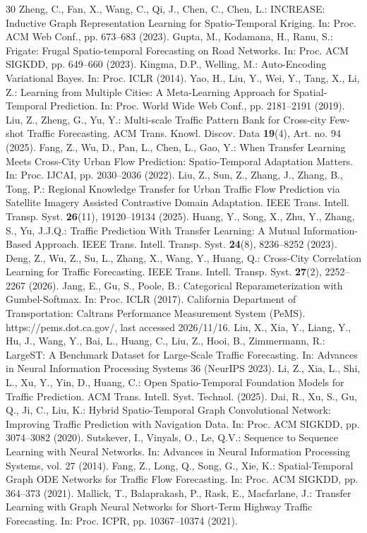 \documentclass[runningheads,a4paper]{llncs}
\begin{document}
\begin{thebibliography}{30}
 Zheng, C., Fan, X., Wang, C., Qi, J., Chen, C., Chen, L.: INCREASE: Inductive Graph Representation Learning for Spatio-Temporal Kriging. In: Proc. ACM Web Conf., pp. 673--683 (2023). 
 Gupta, M., Kodamana, H., Ranu, S.: Frigate: Frugal Spatio-temporal Forecasting on Road Networks. In: Proc. ACM SIGKDD, pp. 649--660 (2023). 
 Kingma, D.P., Welling, M.: Auto-Encoding Variational Bayes. In: Proc. ICLR (2014).
 Yao, H., Liu, Y., Wei, Y., Tang, X., Li, Z.: Learning from Multiple Cities: A Meta-Learning Approach for Spatial-Temporal Prediction. In: Proc. World Wide Web Conf., pp. 2181--2191 (2019). 
 Liu, Z., Zheng, G., Yu, Y.: Multi-scale Traffic Pattern Bank for Cross-city Few-shot Traffic Forecasting. ACM Trans. Knowl. Discov. Data \textbf{19}(4), Art. no. 94 (2025). 
 Fang, Z., Wu, D., Pan, L., Chen, L., Gao, Y.: When Transfer Learning Meets Cross-City Urban Flow Prediction: Spatio-Temporal Adaptation Matters. In: Proc. IJCAI, pp. 2030--2036 (2022). 
 Liu, Z., Sun, Z., Zhang, J., Zhang, B., Tong, P.: Regional Knowledge Transfer for Urban Traffic Flow Prediction via Satellite Imagery Assisted Contrastive Domain Adaptation. IEEE Trans. Intell. Transp. Syst. \textbf{26}(11), 19120--19134 (2025). 
 Huang, Y., Song, X., Zhu, Y., Zhang, S., Yu, J.J.Q.: Traffic Prediction With Transfer Learning: A Mutual Information-Based Approach. IEEE Trans. Intell. Transp. Syst. \textbf{24}(8), 8236--8252 (2023). 
 Deng, Z., Wu, Z., Su, L., Zhang, X., Wang, Y., Huang, Q.: Cross-City Correlation Learning for Traffic Forecasting. IEEE Trans. Intell. Transp. Syst. \textbf{27}(2), 2252--2267 (2026). 
 Jang, E., Gu, S., Poole, B.: Categorical Reparameterization with Gumbel-Softmax. In: Proc. ICLR (2017).
 California Department of Transportation: Caltrans Performance Measurement System (PeMS). https://pems.dot.ca.gov/, last accessed 2026/11/16.
 Liu, X., Xia, Y., Liang, Y., Hu, J., Wang, Y., Bai, L., Huang, C., Liu, Z., Hooi, B., Zimmermann, R.: LargeST: A Benchmark Dataset for Large-Scale Traffic Forecasting. In: Advances in Neural Information Processing Systems 36 (NeurIPS 2023).
 Li, Z., Xia, L., Shi, L., Xu, Y., Yin, D., Huang, C.: Open Spatio-Temporal Foundation Models for Traffic Prediction. ACM Trans. Intell. Syst. Technol. (2025). 
 Dai, R., Xu, S., Gu, Q., Ji, C., Liu, K.: Hybrid Spatio-Temporal Graph Convolutional Network: Improving Traffic Prediction with Navigation Data. In: Proc. ACM SIGKDD, pp. 3074--3082 (2020).
 Sutskever, I., Vinyals, O., Le, Q.V.: Sequence to Sequence Learning with Neural Networks. In: Advances in Neural Information Processing Systems, vol. 27 (2014).
 Fang, Z., Long, Q., Song, G., Xie, K.: Spatial-Temporal Graph ODE Networks for Traffic Flow Forecasting. In: Proc. ACM SIGKDD, pp. 364--373 (2021).
 Mallick, T., Balaprakash, P., Rask, E., Macfarlane, J.: Transfer Learning with Graph Neural Networks for Short-Term Highway Traffic Forecasting. In: Proc. ICPR, pp. 10367--10374 (2021).
\end{thebibliography}
\end{document}
